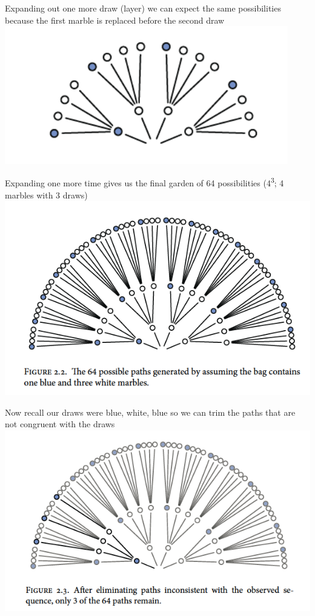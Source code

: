 \documentclass[
]{book}
\theoremstyle{definition}
\theoremstyle{definition}
\theoremstyle{definition}
\theoremstyle{definition}
\theoremstyle{remark}
\begin{document}
Expanding out one more draw (layer) we can expect the same possibilities because the first marble is replaced before the second draw\\

\includegraphics[width=4.86in]{./_images/fig2.2}

Expanding one more time gives us the final garden of 64 possibilities (4\textsuperscript{3}; 4 marbles with 3 draws)\\

\includegraphics[width=8.06in]{./_images/fig2.3}

Now recall our draws were blue, white, blue so we can trim the paths that are not congruent with the draws\\

\includegraphics[width=8.35in]{./_images/fig2.4}
\end{document}
